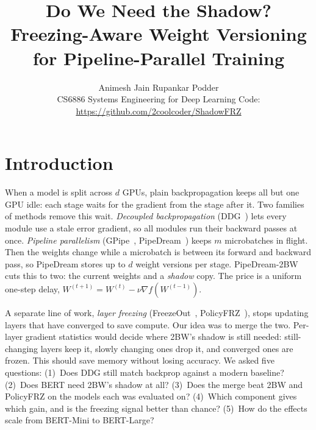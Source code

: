 \documentclass[10pt,twocolumn]{article}
\title{\vspace{-1.2em}\textbf{Do We Need the Shadow?}\\[0.1em]
  {\large\textbf{Freezing-Aware Weight Versioning for Pipeline-Parallel Training}}\vspace{-0.6em}}
\author{Animesh Jain \qquad Rupankar Podder\\[0.2em]
  \small CS6886 Systems Engineering for Deep Learning \quad
  \small Code: \url{https://github.com/2coolcoder/ShadowFRZ}}
\date{\vspace{-2.2em}}
\begin{document}
\maketitle

\section{Introduction}
When a model is split across $d$ GPUs, plain backpropagation keeps all but one GPU idle:
each stage waits for the gradient from the stage after it. Two families of methods remove this
wait. \emph{Decoupled backpropagation} (DDG~\cite{ddg}) lets every module use a stale error
gradient, so all modules run their backward passes at once. \emph{Pipeline parallelism}
(GPipe~\cite{gpipe}, PipeDream~\cite{pipedream}) keeps $m$ microbatches in flight. Then the
weights change while a microbatch is between its forward and backward pass, so PipeDream
stores up to $d$ weight versions per stage. PipeDream-2BW~\cite{pd2bw} cuts this to two: the
current weights and a \emph{shadow} copy. The price is a uniform one-step delay,
$W^{(t+1)} = W^{(t)} - \nu \nabla f(W^{(t-1)})$.

A separate line of work, \emph{layer freezing} (FreezeOut~\cite{freezeout},
PolicyFRZ~\cite{policyfrz}), stops updating layers that have converged to save compute. Our
idea was to merge the two. Per-layer gradient statistics would decide where 2BW's shadow is
still needed: still-changing layers keep it, slowly changing ones drop it, and converged ones are
frozen. This should save memory without losing accuracy. We asked five questions:
(1)~Does DDG still match backprop against a modern baseline?
(2)~Does BERT need 2BW's shadow at all?
(3)~Does the merge beat 2BW and PolicyFRZ on the models each was evaluated on?
(4)~Which component gives which gain, and is the freezing signal better than chance?
(5)~How do the effects scale from BERT-Mini to BERT-Large?
\end{document}
